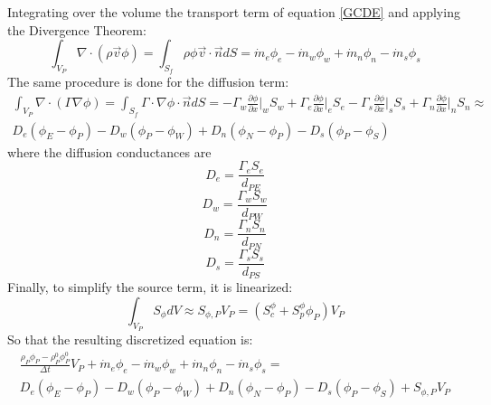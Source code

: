 Integrating over the volume the transport term of equation \ref{GCDE} and applying the Divergence Theorem:
\begin{equation}
\int_{V_{P}}\nabla\cdot\left(\rho\vec{v}\phi\right)=\int_{S_{f}}\rho\phi\vec{v}\cdot\vec{n}dS=\dot{m}_{e}\phi_{e}-\dot{m}_{w}\phi_{w}+\dot{m}_{n}\phi_{n}-\dot{m}_{s}\phi_{s}
\end{equation}
The same procedure is done for the diffusion term:
\begin{multline}
\int_{V_{P}}\nabla\cdot\left(\Gamma\nabla\phi\right)=\int_{S_{f}}\Gamma\cdot\nabla\phi\cdot\vec{n}dS=-\Gamma_{w}\frac{\partial\phi}{\partial x}\bigg|_{w}S_{w}+\Gamma_{e}\frac{\partial\phi}{\partial x}\bigg|_{e}S_{e}-\Gamma_{s}\frac{\partial\phi}{\partial x}\bigg|_{s}S_{s}+\Gamma_{n}\frac{\partial\phi}{\partial x}\bigg|_{n}S_{n}\approx \\
D_{e}\left(\phi_{E}-\phi_{P}\right)-D_{w}\left(\phi_{P}-\phi_{W}\right)+D_{n}\left(\phi_{N}-\phi_{P}\right)-D_{s}\left(\phi_{P}-\phi_{S}\right)
\end{multline}
where the diffusion conductances are
\begin{equation}
D_{e}=\frac{\Gamma_{e}S_{e}}{d_{PE}}
\end{equation}
\begin{equation}
D_{w}=\frac{\Gamma_{w}S_{w}}{d_{PW}}
\end{equation}
\begin{equation}
D_{n}=\frac{\Gamma_{n}S_{n}}{d_{PN}}
\end{equation}
\begin{equation}
D_{s}=\frac{\Gamma_{s}S_{s}}{d_{PS}}
\end{equation}
Finally, to simplify the source term, it is linearized:
\begin{equation}
\int_{V_{P}}S_{\phi}dV\approx S_{\phi,P}V_{P}=\left(S_{c}^{\phi}+S_{p}^{\phi}\phi_{P}\right)V_{P}
\end{equation}
So that the resulting discretized equation is:
\begin{multline}
\frac{\rho_{P}\phi_{P}-\rho_{P}^{0}\phi_{P}^{0}}{\Delta t}V_{P}+\dot{m}_{e}\phi_{e}-\dot{m}_{w}\phi_{w}+\dot{m}_{n}\phi_{n}-\dot{m}_{s}\phi_{s}= \\
D_{e}\left(\phi_{E}-\phi_{P}\right)-D_{w}\left(\phi_{P}-\phi_{W}\right)+D_{n}\left(\phi_{N}-\phi_{P}\right)-D_{s}\left(\phi_{P}-\phi_{S}\right)+S_{\phi,P}V_{P}
\label{IntermGCDE}
\end{multline}

